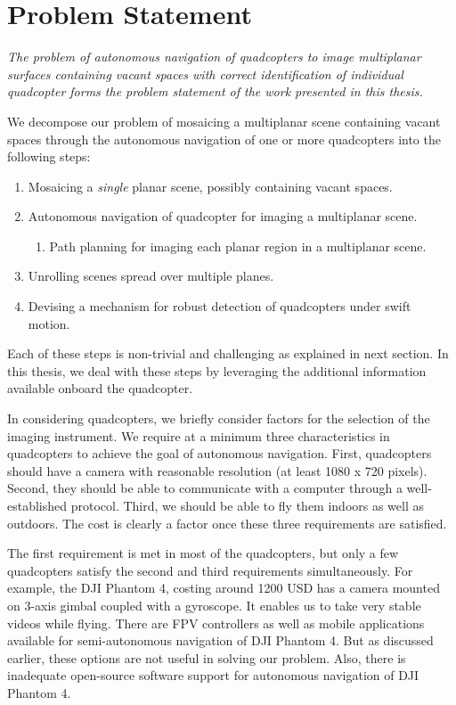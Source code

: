 \section*{Problem Statement}
\textit{The problem of autonomous navigation of quadcopters to image
  multiplanar surfaces containing vacant spaces with correct
  identification of individual quadcopter forms the problem statement
  of the work presented in this thesis.}

We decompose our problem of mosaicing a multiplanar scene containing
vacant spaces through the autonomous navigation of one or more
quadcopters into the following steps:
\begin{enumerate}
  \item Mosaicing a \textit{single} planar scene, possibly containing vacant
  spaces.
  \item Autonomous navigation of quadcopter for imaging a multiplanar scene.
	\begin{enumerate}
  		\item Path planning for imaging each planar region in a multiplanar scene.
	\end{enumerate}
  \item Unrolling scenes spread over multiple planes.
  \item Devising a mechanism for robust detection of quadcopters under swift
  motion.
\end{enumerate}
Each of these steps is non-trivial and challenging as explained in
next section. In this thesis, we deal with these steps by leveraging
the additional information available onboard the quadcopter.

In considering quadcopters, we briefly consider factors for the selection of
the imaging instrument. We require at a minimum three characteristics in
quadcopters to achieve the goal of autonomous navigation. First, quadcopters
should have a camera with reasonable resolution (at least 1080 x 720
pixels). Second, they should be able to communicate with a computer
through a well-established protocol. Third, we should be able to fly
them indoors as well as outdoors. The cost is clearly a factor once
these three requirements are satisfied.

The first requirement is met in most of the quadcopters, but only a
few quadcopters satisfy the second and third requirements
simultaneously. For example, the DJI Phantom 4, costing around 1200
USD has a camera mounted on 3-axis gimbal coupled with a gyroscope. It
enables us to take very stable videos while flying. There are FPV
controllers as well as mobile applications available for
semi-autonomous navigation of DJI Phantom 4. But as discussed earlier,
these options are not useful in solving our problem.  Also, there is
inadequate open-source software support for autonomous navigation of
DJI Phantom 4.

